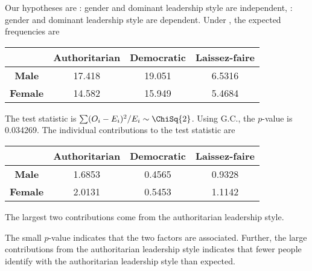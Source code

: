\begin{solution}
    Our hypotheses are \nullhyp: gender and dominant leadership style are independent, \althyp: gender and dominant leadership style are dependent. Under \nullhyp, the expected frequencies are
    \begin{table}[H]
        \centering
        \begin{tabular}{|c|c|c|c|}
            \hline
            & \textbf{Authoritarian} & \textbf{Democratic} & \textbf{Laissez-faire} \\ \hline
            \textbf{Male} & 17.418 & 19.051 & 6.5316 \\ \hline
            \textbf{Female} & 14.582 & 15.949 & 5.4684 \\ \hline
        \end{tabular}
    \end{table}
    The test statistic is $\sum (O_i - E_i)^2/ E_i \sim \ChiSq{2}$. Using G.C., the $p$-value is 0.034269. The individual contributions to the test statistic are
    \begin{table}[H]
        \centering
        \begin{tabular}{|c|c|c|c|}
            \hline
            & \textbf{Authoritarian} & \textbf{Democratic} & \textbf{Laissez-faire} \\ \hline
            \textbf{Male} & 1.6853 & 0.4565 & 0.9328 \\ \hline
            \textbf{Female} & 2.0131 & 0.5453 & 1.1142 \\ \hline
        \end{tabular}
    \end{table}
    The largest two contributions come from the authoritarian leadership style.

    The small $p$-value indicates that the two factors are associated. Further, the large contributions from the authoritarian leadership style indicates that fewer people identify with the authoritarian leadership style than expected.
\end{solution}

